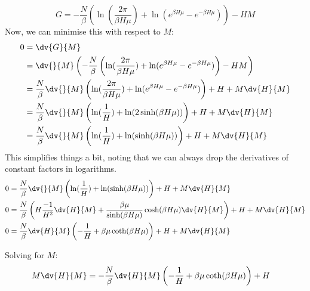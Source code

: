 \documentclass[../../PS3.tex]{subfiles}
\begin{document}
\begin{equation}
	G = - \frac{N}{\beta} \left( \ln(\frac{2 \pi }{\beta H \mu}) + \ln(e^{\beta H\mu} - e^{-\beta H \mu} ) \right) - HM
\end{equation}
Now, we can minimise this with respect to $M$:
\begin{align}
	0 &= \dv{G}{M} \\
	&= \dv{}{M} \left( - \frac{N}{\beta} \left( \ln(\frac{2 \pi }{\beta H \mu}) + \ln(e^{\beta H\mu} - e^{-\beta H \mu} ) \right) - HM \right) \\
	&= \frac{N}{\beta}  \dv{}{M}  \left( \ln(\frac{2 \pi }{\beta H \mu}) + \ln(e^{\beta H\mu} - e^{-\beta H \mu} ) \right) + H + M \dv{H}{M} \\
	&= \frac{N}{\beta}  \dv{}{M}  \left( \ln(\frac{1}{H}) + \ln(2\sinh(\beta H \mu ) ) \right) + H + M \dv{H}{M} \\
	&= \frac{N}{\beta}  \dv{}{M}  \left( \ln(\frac{1}{H}) + \ln(\sinh(\beta H \mu ) ) \right) + H + M \dv{H}{M}
\end{align}
This simplifies things a bit, noting that we can always drop the derivatives of constant factors in logarithms.
\begin{align}
	0 &= \frac{N}{\beta}  \dv{}{M}  \left( \ln(\frac{1}{H}) + \ln(\sinh(\beta H \mu ) ) \right) + H + M \dv{H}{M} \\
	0 &= \frac{N}{\beta}  \left( H \frac{ -1}{H^2} \dv{H}{M} + \frac{\beta \mu }{\sinh(\beta H \mu)} \cosh(\beta H \mu ) \dv{H}{M} \right) + H + M \dv{H}{M} \\
	0 &= \frac{N}{\beta} \dv{H}{M} \left( -\frac{1}{H} + \beta \mu \coth(\beta H \mu ) \right) + H + M \dv{H}{M}
\end{align}	

Solving for $M$:
\begin{align}
	M \dv{H}{M} &= - \frac{N}{\beta} \dv{H}{M} \left( -\frac{1}{H} + \beta \mu \coth(\beta H \mu ) \right) + H  
\end{align}
\end{document}
